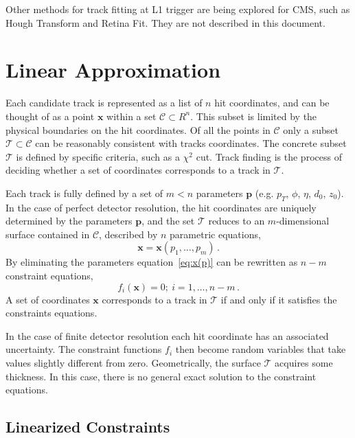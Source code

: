 \documentclass[10pt,a4paper]{report}
\begin{document}
Other methods for track fitting at L1 trigger are being explored for CMS, such as Hough Transform and Retina Fit. They are not described in this document.

\section{Linear Approximation}

Each candidate track is represented as a list of $n$ hit coordinates, and can be thought of as a point $\mathbf{x}$ within a set $\mathcal{C} \subset R^n$. This subset is limited by the physical boundaries on the hit coordinates. Of all the points in $\mathcal{C}$ only a subset $\mathcal{T} \subset \mathcal{C}$ can be reasonably consistent with tracks coordinates. The concrete subset $\mathcal{T}$ is defined by specific criteria, such as a $\chi^2$ cut. Track finding is the process of deciding whether a set of coordinates corresponds to a track in $\mathcal{T}$.

Each track is fully defined by a set of $m < n$ parameters $\mathbf{p}$ (e.g. $p_T$, $\phi$, $\eta$, $d_0$, $z_0$). In the case of perfect detector resolution, the hit coordinates are uniquely determined by the parameters $\mathbf{p}$, and the set $\mathcal{T}$ reduces to an $m$-dimensional surface contained in $\mathcal{C}$, described by $n$ parametric equations,
\begin{equation}
\mathbf{x} = \mathbf{x}(p_1, \dots, p_m)\, .
\label{eq:x(p)}
\end{equation}
By eliminating the parameters equation~\ref{eq:x(p)} can be rewritten as $n - m$ constraint equations,
\begin{equation}
f_i(\mathbf{x}) = 0;\ i = 1, \dots, n-m\, .
\label{eq:constraints}
\end{equation}
A set of coordinates $\mathbf{x}$ corresponds to a track in $\mathcal{T}$ if and only if it satisfies the constraints equations.

In the case of finite detector resolution each hit coordinate has an associated uncertainty. The constraint functions ${f_i}$ then become random variables that take values slightly different from zero. Geometrically, the surface $\mathcal{T}$ acquires some thickness. In this case, there is no general exact solution to the constraint equations.

\subsection{Linearized Constraints}
\end{document}
